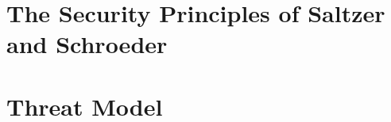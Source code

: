 \documentclass{article}
\begin{document}


\section{The Security Principles of Saltzer and Schroeder}



\section{Threat Model}

\end{document}
